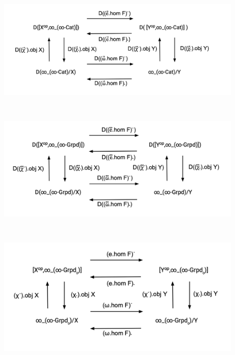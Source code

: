 \documentclass{book}
\theoremstyle{definition}
\begin{document}
\ \\

\begin{center}
\includegraphics[width=0.9\textwidth]{ND11.png} \\
\end{center}

\ \\

\begin{center}
\includegraphics[width=0.9\textwidth]{ND21.png} \\
\end{center}


\newpage

\ \\

\begin{center}
\includegraphics[width=0.9\textwidth]{ND00.png} \\
\end{center}

\ \\
\end{document}
